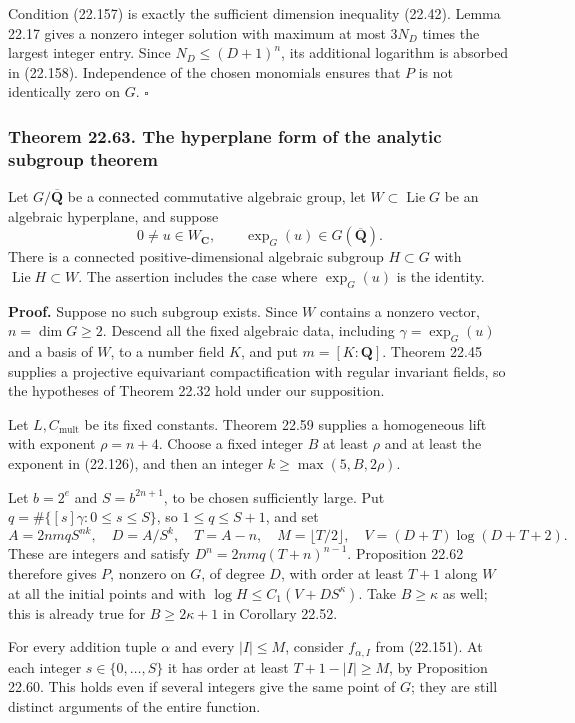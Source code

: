 \documentclass[
  11pt,
  a4paper,
]{article}
\begin{document}
Condition (22.157) is exactly the sufficient dimension inequality
(22.42). Lemma 22.17 gives a nonzero integer solution with maximum at
most \(3N_D\) times the largest integer entry. Since \(N_D\le(D+1)^n\),
its additional logarithm is absorbed in (22.158). Independence of the
chosen monomials ensures that \(P\) is not identically zero on \(G\).
\(\square\)

\subsubsection{Theorem 22.63. The hyperplane form of the analytic
subgroup
theorem}\label{theorem-22.63.-the-hyperplane-form-of-the-analytic-subgroup-theorem}

Let \(G/\overline{\mathbf Q}\) be a connected commutative algebraic
group, let \(W\subset\operatorname{Lie}G\) be an algebraic hyperplane,
and suppose \[
 0\ne u\in W_{\mathbf C},\qquad \exp_G(u)\in G(\overline{\mathbf Q}).
 \tag{22.159}
\] There is a connected positive-dimensional algebraic subgroup
\(H\subset G\) with \(\operatorname{Lie}H\subset W\). The assertion
includes the case where \(\exp_G(u)\) is the identity.

\textbf{Proof.} Suppose no such subgroup exists. Since \(W\) contains a
nonzero vector, \(n=\dim G\ge2\). Descend all the fixed algebraic data,
including \(\gamma=\exp_G(u)\) and a basis of \(W\), to a number field
\(K\), and put \(m=[K:\mathbf Q]\). Theorem 22.45 supplies a projective
equivariant compactification with regular invariant fields, so the
hypotheses of Theorem 22.32 hold under our supposition.

Let \(L,C_{\mathrm{mult}}\) be its fixed constants. Theorem 22.59
supplies a homogeneous lift with exponent \(\rho=n+4\). Choose a fixed
integer \(B\) at least \(\rho\) and at least the exponent in (22.126),
and then an integer \(k\ge\max(5,B,2\rho)\).

Let \(b=2^e\) and \(S=b^{2n+1}\), to be chosen sufficiently large. Put
\(q=\#\{[s]\gamma:0\le s\le S\}\), so \(1\le q\le S+1\), and set \[
 A=2nmqS^{nk},\quad D=A/S^k,\quad T=A-n,\quad
 M=\lfloor T/2\rfloor,\quad V=(D+T)\log(D+T+2).
 \tag{22.160}
\] These are integers and satisfy \(D^n=2nmq(T+n)^{n-1}\). Proposition
22.62 therefore gives \(P\), nonzero on \(G\), of degree \(D\), with
order at least \(T+1\) along \(W\) at all the initial points and with
\(\log H\le C_1(V+DS^\kappa)\). Take \(B\ge\kappa\) as well; this is
already true for \(B\ge2\kappa+1\) in Corollary 22.52.

For every addition tuple \(\alpha\) and every \(|I|\le M\), consider
\(f_{\alpha,I}\) from (22.151). At each integer \(s\in\{0,\ldots,S\}\)
it has order at least \(T+1-|I|\ge M\), by Proposition 22.60. This holds
even if several integers give the same point of \(G\); they are still
distinct arguments of the entire function.
\end{document}
